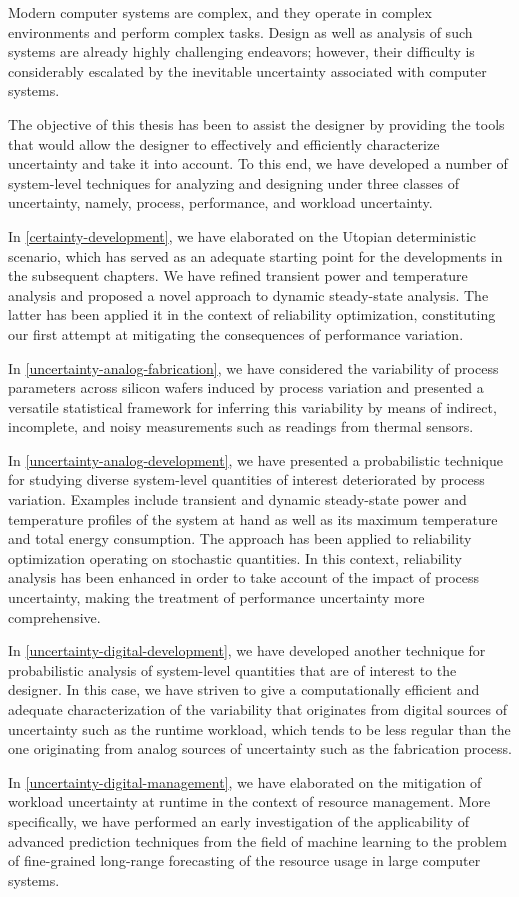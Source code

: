 Modern computer systems are complex, and they operate in complex environments
and perform complex tasks. Design as well as analysis of such systems are
already highly challenging endeavors; however, their difficulty is considerably
escalated by the inevitable uncertainty associated with computer systems.

The objective of this thesis has been to assist the designer by providing the
tools that would allow the designer to effectively and efficiently characterize
uncertainty and take it into account. To this end, we have developed a number of
system-level techniques for analyzing and designing under three classes of
uncertainty, namely, process, performance, and workload uncertainty.

In \cref{certainty-development}, we have elaborated on the Utopian deterministic
scenario, which has served as an adequate starting point for the developments in
the subsequent chapters. We have refined transient power and temperature
analysis and proposed a novel approach to dynamic steady-state analysis. The
latter has been applied it in the context of reliability optimization,
constituting our first attempt at mitigating the consequences of performance
variation.

In \cref{uncertainty-analog-fabrication}, we have considered the variability of
process parameters across silicon wafers induced by process variation and
presented a versatile statistical framework for inferring this variability by
means of indirect, incomplete, and noisy measurements such as readings from
thermal sensors.

In \cref{uncertainty-analog-development}, we have presented a probabilistic
technique for studying diverse system-level quantities of interest deteriorated
by process variation. Examples include transient and dynamic steady-state power
and temperature profiles of the system at hand as well as its maximum
temperature and total energy consumption. The approach has been applied to
reliability optimization operating on stochastic quantities. In this context,
reliability analysis has been enhanced in order to take account of the impact of
process uncertainty, making the treatment of performance uncertainty more
comprehensive.

In \cref{uncertainty-digital-development}, we have developed another technique
for probabilistic analysis of system-level quantities that are of interest to
the designer. In this case, we have striven to give a computationally efficient
and adequate characterization of the variability that originates from digital
sources of uncertainty such as the runtime workload, which tends to be less
regular than the one originating from analog sources of uncertainty such as the
fabrication process.

In \cref{uncertainty-digital-management}, we have elaborated on the mitigation
of workload uncertainty at runtime in the context of resource management.
More specifically, we have performed an early investigation of the applicability
of advanced prediction techniques from the field of machine learning to the
problem of fine-grained long-range forecasting of the resource usage in large
computer systems.
